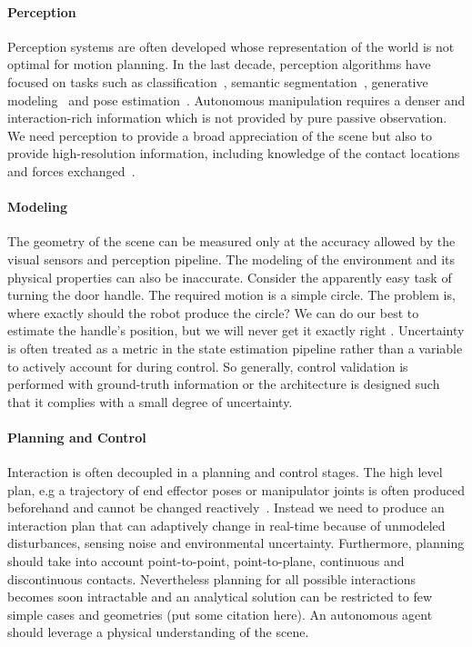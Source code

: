 \paragraph{Perception} Perception systems are often developed whose representation of the world is not optimal for motion planning. In the last decade, perception algorithms have focused on tasks such as classification~\citep{redmon2016you}, semantic segmentation~\cite{badrinarayanan2017segnet}, generative modeling~\citep{karras2019stylebased} and pose estimation~\cite{xiang2017posecnn}. Autonomous manipulation requires a denser and interaction-rich information which is not provided by pure passive observation. We need perception to provide a broad appreciation of the scene but also to provide high-resolution information, including knowledge of the contact locations and forces exchanged~\cite{mason2018toward}. 

\paragraph{Modeling} The geometry of the scene can be measured only at the accuracy allowed by the visual sensors and perception pipeline. The modeling of the environment and its physical properties can also be inaccurate. Consider the apparently easy task of turning the door handle. The required motion is a simple circle. The problem is, where exactly should the robot produce the circle? We can do our best to estimate the handle’s position, but we will never get it exactly right \citep{mason2018toward}. Uncertainty is often treated as a metric in the state estimation pipeline rather than a variable to actively account for during control. So generally, control validation is performed with ground-truth information or the architecture is designed such that it complies with a small degree of uncertainty.

\paragraph{Planning and Control} Interaction is often decoupled in a planning and control stages. The high level plan, e.g a trajectory of end effector poses or manipulator joints is often produced beforehand and cannot be changed reactively~\cite{chitta2012moveit}. Instead we need to produce an interaction plan that can adaptively change in real-time because of unmodeled disturbances, sensing noise and environmental uncertainty. Furthermore, planning should take into account point-to-point, point-to-plane, continuous and discontinuous contacts. Nevertheless planning for all possible interactions becomes soon intractable and an analytical solution can be restricted to few simple cases and geometries (put some citation here). An autonomous agent should leverage a physical understanding of the scene.

